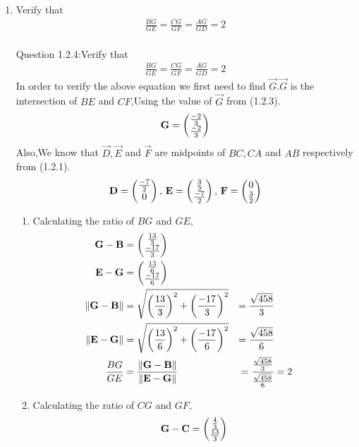 \documentclass[11pt]{book}
\begin{document}
\begin{enumerate}[label=\thesection.\arabic*.,ref=\thesection.\theenumi]
\item Verify that 
		\begin{align}
			\frac{BG}{GE} = 
			\frac{CG}{GF} =
			\frac{AG}{GD} =2 
		\end{align}\\
Question 1.2.4:Verify that 
\begin{align}
		\frac{BG}{GE} = 
		\frac{CG}{GF} =
		\frac{AG}{GD} = 2 
\end{align}
\solution In order to verify the above equation we first need to find $\vec{G}$.$\vec{G}$ is the intersection of $BE$ and $CF$,Using the value of $\vec{G}$ from (1.2.3).
\begin{align}
		\mathbf{G} = \begin{pmatrix}\frac{-2}{3} \\ \frac{-2}{3}\end{pmatrix}
\end{align}
Also,We know that $\vec{D}, \vec{E}$ and $\vec{F}$ are midpoints of $BC, CA$ and $AB$ respectively from (1.2.1).
\begin{align}
		\mathbf{D} = \begin{pmatrix}\frac{-7}{2} \\ 0\end{pmatrix},\,
		\mathbf{E} = \begin{pmatrix}\frac{3}{2} \\ \frac{-7}{2}\end{pmatrix},\,
		\mathbf{F} = \begin{pmatrix}0 \\ \frac{3}{2}\end{pmatrix}
\end{align}
\begin{enumerate}
\item Calculating the ratio of $BG$ and $GE$,
\begin{align}
		\label{eq:tri-pts/4} \vec{G}-\vec{B} &= \myvec{\frac{13}{3} \\ \frac{-17}{3}} \\
		\label{eq:tri-pts/5} \vec{E}-\vec{G} &= \myvec{\frac{13}{6} \\ \frac{-17}{6}} \\
		\label{eq:tri-pts/6} \norm{\vec{G}-\vec{B}} &= \sqrt{\brak{\frac{13}{3}}^2 + \brak{\frac{-17}{3}}^{2}} &= \frac{\sqrt{458}}{3} \\
		\label{eq:tri-pts/7} \norm{\vec{E}-\vec{G}} &= \sqrt{\brak{\frac{13}{6}}^2 + \brak{\frac{-17}{6}}^2} &= \frac{\sqrt{458}}{6} \\
		\label{eq:tri-pts/8}\frac{BG}{GE} &= \frac{\norm{\vec{G}-\vec{B}}}{\norm{\vec{E}-\vec{G}}} &= \frac{\frac{\sqrt{458}}{3}}{\frac{\sqrt{458}}{6}} &= 2  
\end{align}		
\item Calculating the ratio of $CG$ and $GF$,
\begin{align}
		\label{eq:tri-pts/9} \vec{G}-\vec{C} &= \myvec{\frac{4}{3} \\ \frac{13}{3}} \\

\end{align}
\end{enumerate}
\end{enumerate}
\end{document}
